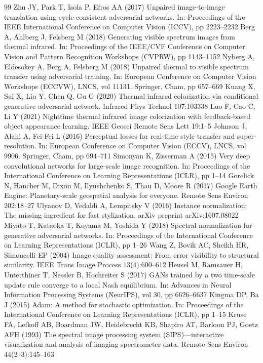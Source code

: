 \documentclass[10pt,a4paper,twoside]{article}
\begin{document}
\begin{thebibliography}{99}
     Zhu JY, Park T, Isola P, Efros AA (2017) Unpaired image-to-image translation using cycle-consistent adversarial networks. In: Proceedings of the IEEE International Conference on Computer Vision (ICCV), pp 2223--2232
     Berg A, Ahlberg J, Felsberg M (2018) Generating visible spectrum images from thermal infrared. In: Proceedings of the IEEE/CVF Conference on Computer Vision and Pattern Recognition Workshops (CVPRW), pp 1143--1152
     Nyberg A, Eldesokey A, Berg A, Felsberg M (2018) Unpaired thermal to visible spectrum transfer using adversarial training. In: European Conference on Computer Vision Workshops (ECCVW), LNCS, vol 11131. Springer, Cham, pp 657--669
     Kuang X, Sui X, Liu Y, Chen Q, Gu G (2020) Thermal infrared colorization via conditional generative adversarial network. Infrared Phys Technol 107:103338
     Luo F, Cao C, Li Y (2021) Nighttime thermal infrared image colorization with feedback-based object appearance learning. IEEE Geosci Remote Sens Lett 19:1--5
     Johnson J, Alahi A, Fei-Fei L (2016) Perceptual losses for real-time style transfer and super-resolution. In: European Conference on Computer Vision (ECCV), LNCS, vol 9906. Springer, Cham, pp 694--711
     Simonyan K, Zisserman A (2015) Very deep convolutional networks for large-scale image recognition. In: Proceedings of the International Conference on Learning Representations (ICLR), pp 1--14
     Gorelick N, Hancher M, Dixon M, Ilyushchenko S, Thau D, Moore R (2017) Google Earth Engine: Planetary-scale geospatial analysis for everyone. Remote Sens Environ 202:18--27
     Ulyanov D, Vedaldi A, Lempitsky V (2016) Instance normalization: The missing ingredient for fast stylization. arXiv preprint arXiv:1607.08022
     Miyato T, Kataoka T, Koyama M, Yoshida Y (2018) Spectral normalization for generative adversarial networks. In: Proceedings of the International Conference on Learning Representations (ICLR), pp 1--26
     Wang Z, Bovik AC, Sheikh HR, Simoncelli EP (2004) Image quality assessment: From error visibility to structural similarity. IEEE Trans Image Process 13(4):600--612
     Heusel M, Ramsauer H, Unterthiner T, Nessler B, Hochreiter S (2017) GANs trained by a two time-scale update rule converge to a local Nash equilibrium. In: Advances in Neural Information Processing Systems (NeurIPS), vol 30, pp 6626--6637
     Kingma DP, Ba J (2015) Adam: A method for stochastic optimization. In: Proceedings of the International Conference on Learning Representations (ICLR), pp 1--15
     Kruse FA, Lefkoff AB, Boardman JW, Heidebrecht KB, Shapiro AT, Barloon PJ, Goetz AFH (1993) The spectral image processing system (SIPS)---interactive visualization and analysis of imaging spectrometer data. Remote Sens Environ 44(2--3):145--163
\end{thebibliography}
\end{document}
